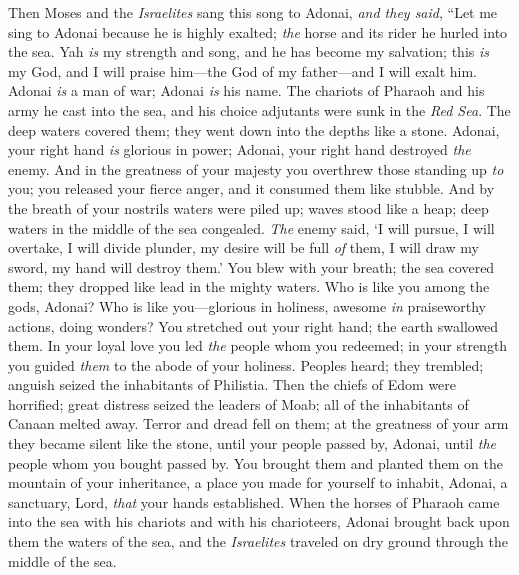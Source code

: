 \begin{biblechapter} %
 Then Moses and the \textit{Israelites} sang this song to Adonai, \textit{and they said},
\verse “Let me sing to Adonai because he is highly exalted; 
\textit{the} horse and its rider he hurled into the sea.
\verse Yah \textit{is} my strength and song, and he has become my salvation; 
this \textit{is} my God, and I will praise him—the God of my father—and I will exalt him.
\verse Adonai \textit{is} a man of war; Adonai \textit{is} his name.
\verse The chariots of Pharaoh and his army he cast into the sea, 
and his choice adjutants were sunk in the \textit{Red Sea}.
\verse The deep waters covered them; 
they went down into the depths like a stone.
\verse Adonai, your right hand \textit{is} glorious in power; 
Adonai, your right hand destroyed \textit{the} enemy.
\verse And in the greatness of your majesty you overthrew those standing up \textit{to} you; 
you released your fierce anger, and it consumed them like stubble.
\verse And by the breath of your nostrils waters were piled up; 
waves stood like a heap; 
deep waters in the middle of the sea congealed.
\verse \textit{The} enemy said, ‘I will pursue, I will overtake, I will divide plunder, 
my desire will be full \textit{of} them, I will draw my sword, my hand will destroy them.’
\verse You blew with your breath; the sea covered them; 
they dropped like lead in the mighty waters.
\verse Who is like you among the gods, Adonai? 
Who is like you—glorious in holiness, awesome \textit{in} praiseworthy actions, doing wonders?
\verse You stretched out your right hand; 
the earth swallowed them.
\verse In your loyal love you led \textit{the} people whom you redeemed; 
in your strength you guided \textit{them} to the abode of your holiness.
\verse Peoples heard; they trembled; 
anguish seized the inhabitants of Philistia.
\verse Then the chiefs of Edom were horrified; great distress seized the leaders of Moab; 
all of the inhabitants of Canaan melted away.
\verse Terror and dread fell on them; 
at the greatness of your arm they became silent like the stone, 
until your people passed by, Adonai, 
until \textit{the} people whom you bought passed by.
\verse You brought them and planted them on the mountain of your inheritance, 
a place you made for yourself to inhabit, Adonai, 
a sanctuary, Lord, \textit{that} your hands established.
\verse When the horses of Pharaoh came into the sea with his chariots and with his charioteers, Adonai brought back upon them the waters of the sea, and the \textit{Israelites} traveled on dry ground through the middle of the sea.

\end{biblechapter}
